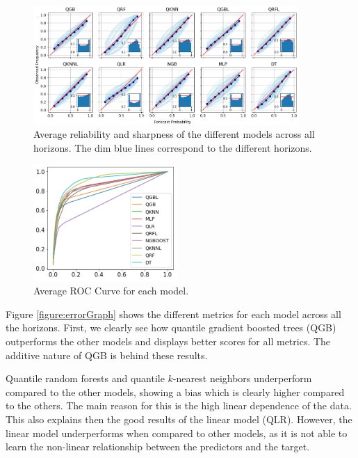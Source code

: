 \documentclass[a4paper,3p,sort&compress]{elsarticle}
\begin{document}
\begin{figure}
  \centering
  \includegraphics[width=0.9\textwidth]{reliability_sharpness}
  \caption{\label{figure:rel_sharp}Average reliability and sharpness
    of the different models across all horizons. The dim blue lines
    correspond to the different horizons. }
\end{figure}       

\begin{figure}
  \centering
  \includegraphics[width=0.49\textwidth]{average_roc}
  \caption{\label{figure:average_roc}Average ROC Curve for each 
  model. }
\end{figure}

Figure \ref{figure:errorGraph} shows the different metrics for each
model across all the horizons. First, we clearly see how 
quantile gradient
boosted trees (QGB) outperforms the other models and displays better scores
for all metrics. The additive nature of QGB is behind these
results.

Quantile random forests and quantile $k$-nearest
neighbors underperform compared to the other models, showing a bias
which is clearly higher compared to the others.  The main reason for
this is the high linear dependence of the data. This also explains
then the good results of the linear model (QLR).  However, the linear
model underperforms when compared to other models, as it is
not able to learn the non-linear relationship between the predictors
and the target.
\end{document}
